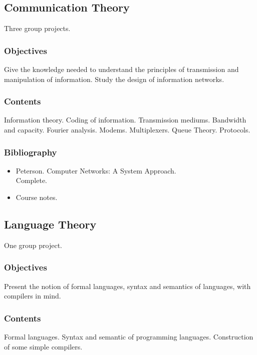 \documentclass[spanish]{article}
\begin{document}
\hrulefill%

\subsection{Communication Theory}
Three group projects.

\subsubsection{Objectives}
Give the knowledge needed to understand the principles of transmission
and manipulation of information. Study the design of information networks.

\subsubsection{Contents}
Information theory. Coding of information. Transmission mediums. Bandwidth and
capacity. Fourier analysis. Modems. Multiplexers. Queue Theory. Protocols.

\subsubsection{Bibliography}
\begin{itemize}
  \item Peterson. Computer Networks: A System Approach.\\
    Complete.
  \item Course notes.
\end{itemize}


\hrulefill%

\subsection{Language Theory}
One group project.

\subsubsection{Objectives}
Present the notion of formal languages, syntax and semantics of languages,
with compilers in mind.

\subsubsection{Contents}
Formal languages. Syntax and semantic of programming languages. Construction
of some simple compilers.
\end{document}
